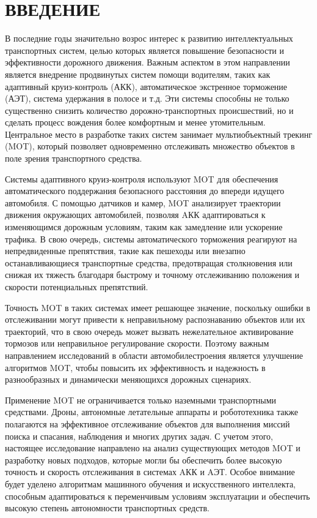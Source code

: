 \chapter*{ВВЕДЕНИЕ}

В последние годы значительно возрос интерес к развитию интеллектуальных транспортных систем, целью которых является повышение безопасности и эффективности дорожного движения. Важным аспектом в этом направлении является внедрение продвинутых систем помощи водителям, таких как адаптивный круиз-контроль (АКК), автоматическое экстренное торможение (АЭТ), система удержания в полосе и т.д. Эти системы способны не только существенно снизить количество дорожно-транспортных происшествий, но и сделать процесс вождения более комфортным и менее утомительным. Центральное место в разработке таких систем занимает мультиобъектный трекинг (MOT), который позволяет одновременно отслеживать множество объектов в поле зрения транспортного средства.

Системы адаптивного круиз-контроля используют MOT для обеспечения автоматического поддержания безопасного расстояния до впереди идущего автомобиля. С помощью датчиков и камер, MOT анализирует траектории движения окружающих автомобилей, позволяя AКК адаптироваться к изменяющимся дорожным условиям, таким как замедление или ускорение трафика. В свою очередь, системы автоматического торможения реагируют на непредвиденные препятствия, такие как пешеходы или внезапно останавливающиеся транспортные средства, предотвращая столкновения или снижая их тяжесть благодаря быстрому и точному отслеживанию положения и скорости потенциальных препятствий.

Точность MOT в таких системах имеет решающее значение, поскольку ошибки в отслеживании могут привести к неправильному распознаванию объектов или их траекторий, что в свою очередь может вызвать нежелательное активирование тормозов или неправильное регулирование скорости. Поэтому важным направлением исследований в области автомобилестроения является улучшение алгоритмов MOT, чтобы повысить их эффективность и надежность в разнообразных и динамически меняющихся дорожных сценариях.

Применение MOT не ограничивается только наземными транспортными средствами. Дроны, автономные летательные аппараты и робототехника также полагаются на эффективное отслеживание объектов для выполнения миссий поиска и спасания, наблюдения и многих других задач. С учетом этого, настоящее исследование направлено на анализ существующих методов MOT и разработку новых подходов, которые могли бы обеспечить более высокую точность и скорость отслеживания в системах AКК и AЭТ. Особое внимание будет уделено алгоритмам машинного обучения и искусственного интеллекта, способным адаптироваться к переменчивым условиям эксплуатации и обеспечить высокую степень автономности транспортных средств.

